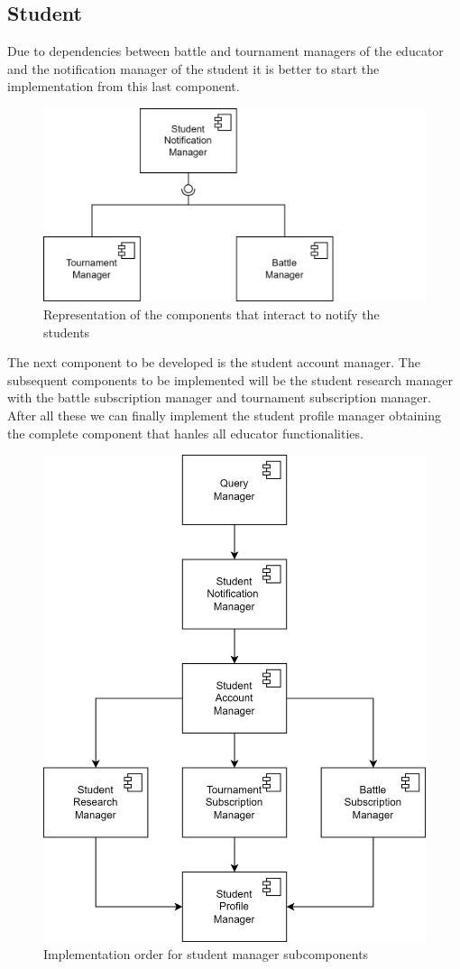 \documentclass[12pt, a4paper]{report}
\begin{document}
    \subsection{Student}
    Due to dependencies between battle and tournament managers of the educator and the notification manager of the student it is better to start the implementation from this last component.
    \begin{figure}[H]
        \centering
        \includegraphics[width=0.5\linewidth]{images/notifications.png}
        \caption{Representation of the components that interact to notify the students}
    \end{figure}
    The next component to be developed is the student account manager. 
    The subsequent components to be implemented will be the student research manager with the battle subscription manager and tournament subscription manager. 
    After all these we can finally implement the student profile manager obtaining the complete component that hanles all educator functionalities. 
    \begin{figure}[H]
        \centering
        \includegraphics[width=0.5\linewidth]{images/student_impl.png}
        \caption{Implementation order for student manager subcomponents}
    \end{figure}
\end{document}
